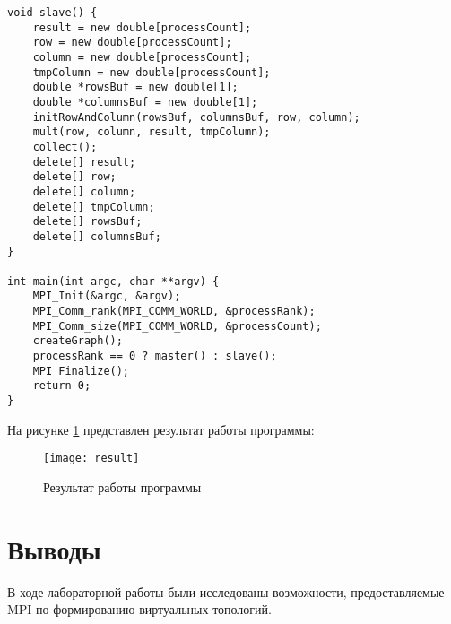 \documentclass[a4paper,14pt]{extarticle}
\begin{document}
\begin{lstlisting}
void slave() { 
    result = new double[processCount]; 
    row = new double[processCount]; 
    column = new double[processCount]; 
    tmpColumn = new double[processCount]; 
    double *rowsBuf = new double[1]; 
    double *columnsBuf = new double[1]; 
    initRowAndColumn(rowsBuf, columnsBuf, row, column); 
    mult(row, column, result, tmpColumn); 
    collect(); 
    delete[] result; 
    delete[] row; 
    delete[] column; 
    delete[] tmpColumn; 
    delete[] rowsBuf; 
    delete[] columnsBuf; 
} 
  
int main(int argc, char **argv) { 
    MPI_Init(&argc, &argv); 
    MPI_Comm_rank(MPI_COMM_WORLD, &processRank); 
    MPI_Comm_size(MPI_COMM_WORLD, &processCount); 
    createGraph(); 
    processRank == 0 ? master() : slave(); 
    MPI_Finalize(); 
    return 0; 
}
\end{lstlisting}

На рисунке \ref{fig:result} представлен результат работы программы:
\begin{figure}[H]
    \centering
    \texttt{[image: result]}
    \caption{Результат работы программы}
    \label{fig:result}
\end{figure}

\section*{Выводы}
В ходе лабораторной работы были исследованы возможности, предоставляемые MPI по формированию виртуальных топологий.
\end{document}

